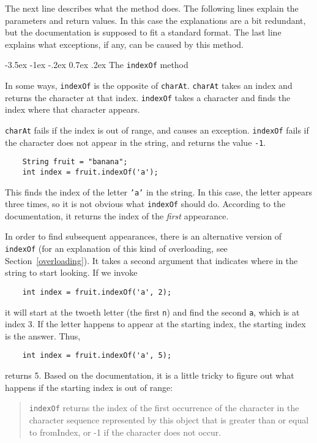 \documentclass{book}
\makeatletter
\renewcommand{\section}{\@startsection 
    {section} {1} {0mm}%
    {-3.5ex \@plus -1ex \@minus -.2ex}%
    {0.7ex \@plus.2ex}%
    {\normalfont\Large\bfseries}}
\makeatother
\begin{document}
The next line describes what the method does.  The following
lines explain the parameters and return values.  In this case
the explanations are a bit redundant, but the documentation is
supposed to fit a standard format.  The last line explains what
exceptions, if any, can be caused by this method.

\section{The {\tt indexOf} method}

In some ways, {\tt indexOf} is the opposite of {\tt charAt}.
{\tt charAt} takes an index and returns the character at that
index.  {\tt indexOf} takes a character and finds the index
where that character appears.

{\tt charAt} fails if the index is out of range, and causes an
exception.  {\tt indexOf} fails if the character does not appear in
the string, and returns the value {\tt -1}.

\begin{verbatim}
    String fruit = "banana";
    int index = fruit.indexOf('a');
\end{verbatim}
%
This finds the index of the letter {\tt 'a'} in the string.
In this case, the letter appears three times, so it is not
obvious what {\tt indexOf} should do.  According to the
documentation, it returns the index of the {\em first} appearance.

In order to find subsequent appearances, there is an alternative
version of {\tt indexOf} (for an explanation of this kind
of overloading, see Section~\ref{overloading}).  It takes a
second argument that indicates where in the string to start
looking.  If we invoke

\begin{verbatim}
    int index = fruit.indexOf('a', 2);
\end{verbatim}
%
it will start at the twoeth letter (the first {\tt n}) and find
the second {\tt a}, which is at index 3.  If the letter happens
to appear at the starting index, the starting index is the
answer.  Thus,

\begin{verbatim}
    int index = fruit.indexOf('a', 5);
\end{verbatim}
%
returns 5.  Based on the documentation, it is a little tricky
to figure out what happens if the starting index is out
of range:

\begin{quote}
{\tt indexOf} returns the index of the first occurrence of the
character in the character sequence represented by this object that is
greater than or equal to fromIndex, or -1 if the character does not
occur.
\end{quote}
\end{document}
